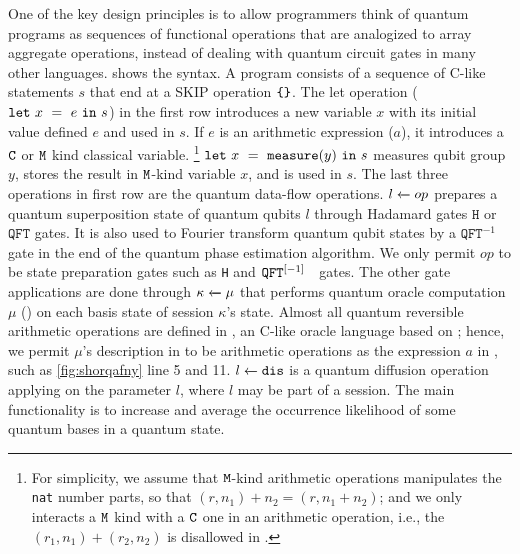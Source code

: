 One of the key \qafny design principles is to allow programmers think of quantum programs as sequences of functional operations that are analogized to array aggregate operations, instead of dealing with quantum circuit gates in many other languages.
 shows the \qafny syntax.
A program consists of a sequence of C-like statements $s$ that end at a SKIP operation $\sskip$.
The let operation ($\sexp{x}{e}{s}$) in the first row introduces a new variable $x$ with its initial value defined $e$ and used in $s$. If $e$ is an arithmetic expression ($a$), it introduces a $\cmode$ or $\mmode$ kind classical variable.
\footnote{For simplicity, we assume that $\mmode$-kind arithmetic operations manipulates the \texttt{nat} number parts, so that $(r,n_1)+n_2=(r,n_1+n_2)$; and we only interacts a $\mmode$ kind with a $\cmode$ one in an arithmetic operation, i.e., the $(r_1,n_1)+(r_2,n_2)$ is disallowed in \qafny.}
$\sexp{x}{\smea{y}}{s}$ measures qubit group $y$, stores the result in $\mmode$-kind variable $x$, and is used in $s$.
The last three operations in first row are the quantum data-flow operations.
$\ssassign{l}{}{op}$ prepares a quantum superposition state of quantum qubits $l$ through Hadamard gates $\texttt{H}$ or $\texttt{QFT}$ gates. It is also used to Fourier transform quantum qubit states by a $\texttt{QFT}^{-1}$ gate in the end of the quantum phase estimation algorithm. We only permit $op$ to be state preparation gates such as \texttt{H} and $\iqft[\lbrack -1 \rbrack]{}{}$ gates.
The other gate applications are done through $\ssassign{\kappa}{}{\mu}$ that performs \oqasm quantum oracle computation $\mu$ (\cite{oracleoopsla}) on each basis state of session $\kappa$'s state. Almost all quantum reversible arithmetic operations are defined in \vqimp, an C-like oracle language based on \oqasm; hence, we permit $\mu$'s description in \qafny to be arithmetic operations as the expression $a$ in , such as \cref{fig:shorqafny} line 5 and 11.
$\ssassign{l}{}{\sdis}$ is a quantum diffusion operation applying on the parameter $l$, where $l$ may be part of a session.
The main functionality is to increase and average the occurrence likelihood of some quantum bases in a quantum state.


